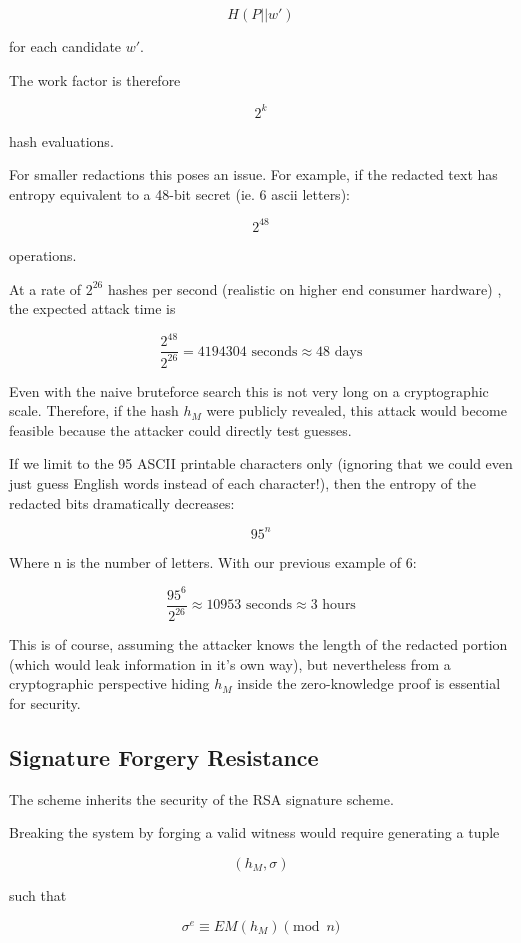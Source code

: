 \documentclass[]{article}
\begin{document}
$$
H(P||w')
$$

for each candidate $w'$.

The work factor is therefore

$$
2^k
$$

hash evaluations.

For smaller redactions this poses an issue. For example, if the redacted text has entropy equivalent to a 48-bit secret (ie. 6 ascii letters):

$$
2^{48}
$$

operations.

At a rate of $2^{26}$ hashes per second (realistic on higher end consumer hardware) \cite{se_challenge_response_2012}, the expected attack time is

$$
\frac{2^{48}}{2^{26}} = 4194304 \text{ seconds} \approx 48 \text{ days}
$$

Even with the naive bruteforce search this is not very long on a cryptographic scale. Therefore, if the hash $h_M$ were publicly revealed, this attack would become feasible because the attacker could directly test guesses.

If we limit to the 95 ASCII printable characters only (ignoring that we could even just guess English words instead of each character!), then the entropy of the redacted bits dramatically decreases:

$$
95^n
$$ 

Where n is the number of letters. With our previous example of 6:

$$
\frac{95^{6}}{2^{26}} \approx 10953 \text{ seconds} \approx 3 \text{ hours}
$$

This is of course, assuming the attacker knows the length of the redacted portion (which would leak information in it's own way), but nevertheless from a cryptographic perspective hiding $h_M$ inside the zero-knowledge proof is essential for security.

\subsection{Signature Forgery Resistance}

The scheme inherits the security of the RSA signature scheme.

Breaking the system by forging a valid witness would require generating a tuple

$$
(h_M,\sigma)
$$

such that

$$
\sigma^e \equiv EM(h_M) \pmod n
$$
\end{document}
